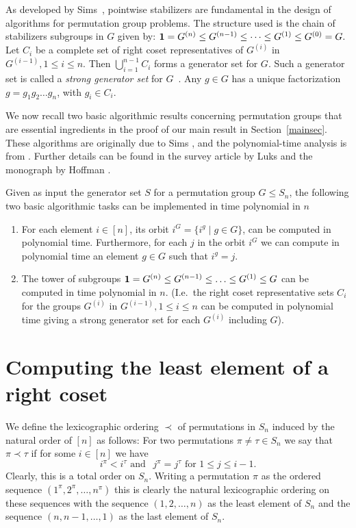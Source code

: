 \documentclass{elsart}
\begin{document}
As developed by Sims~\cite{sims70computational}, pointwise stabilizers
are fundamental in the design of algorithms for permutation group
problems. The structure used is the chain of stabilizers subgroups in
$G$ given by: ${\bf 1}=G^{(n)}\leq G^{(n-1)}\leq \dots \leq
G^{(1)}\leq G^{(0)}=G.$ Let $C_i$ be a complete set of right coset
representatives of $G^{(i)}$ in $G^{(i-1)}, 1\leq i\leq n$. Then
$\bigcup_{i=1}^{n-1} C_i$ forms a generator set for $G$. Such a
generator set is called a {\it strong generator set} for
$G$~\cite{sims70computational,furst80polynomialtime}. Any $g\in G$
has a unique factorization $g=g_1g_2\dots g_n$, with $g_i\in C_i$.

We now recall two basic algorithmic results concerning permutation
groups that are essential ingredients in the proof of our main result
in Section~\ref{mainsec}. These algorithms are originally due to Sims
\cite{sims70computational}, and the polynomial-time analysis is from
\cite{furst80polynomialtime}. Further details can be found in the
survey article by Luks \cite{luks93permutation} and the monograph by
Hoffman \cite{hoffmann82group}.
  
\begin{thm}\label{perm-group-algos}%
 Given as input the generator set $S$ for a permutation group $G\leq
S_n$, the following two basic algorithmic tasks can be implemented in
time polynomial in $n$
\begin{enumerate}{}
\item For each element $i\in[n]$, its orbit $i^G=\{i^g\mid g\in G\}$,
  can be computed in polynomial time.  Furthermore, for each $j$ in
  the orbit $i^G$ we can compute in polynomial time an element $g\in
  G$ such that $i^g=j$.
\item The tower of subgroups ${\bf 1}=G^{(n)}\leq G^{(n-1)} \leq
  \ldots \leq G^{(1)}\leq G$ can be computed in time polynomial in
  $n$. (I.e.\ the right coset representative sets $C_i$ for the groups
  $G^{(i)}$ in $G^{(i-1)}, 1\leq i\leq n$ can be computed in
  polynomial time giving a strong generator set for each $G^{(i)}$
  including $G$).
\end{enumerate}
\end{thm}

\section{Computing the least element of a right coset}\label{lextleast}

We define the lexicographic ordering $\prec$ of permutations in $S_n$
induced by the natural order of $[n]$ as follows: For two permutations
$\pi\neq \tau\in S_n$ we say that $\pi\prec \tau$ if for some
$i\in[n]$ we have
\[
i^\pi<i^\tau \textrm{ and }~~
j^\pi=j^\tau \textrm{ for } 1\leq j\leq i-1.
\]
Clearly, this is a total order on $S_n$. Writing a permutation $\pi$
as the ordered sequence $(1^\pi,2^\pi,\ldots,n^\pi)$ this is clearly
the natural lexicographic ordering on these sequences with the
sequence $(1,2,\ldots,n)$ as the least element of $S_n$ and the
sequence $(n,n-1,\ldots,1)$ as the last element of $S_n$.
   
\end{document}
